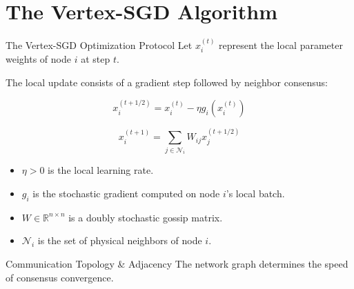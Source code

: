 \section{The Vertex-SGD Algorithm}

\begin{frame}{The Vertex-SGD Optimization Protocol}
    Let $x_i^{(t)}$ represent the local parameter weights of node $i$ at step $t$.
    
    The local update consists of a gradient step followed by neighbor consensus:
    
    \begin{equation}
        x_i^{(t+1/2)} = x_i^{(t)} - \eta g_i\left(x_i^{(t)}\right)
    \end{equation}
    
    \begin{equation}
        x_i^{(t+1)} = \sum_{j \in \mathcal{N}_i} W_{ij} x_j^{(t+1/2)}
    \end{equation}
    
    \vskip 0.5cm
    \begin{itemize}
        \item $\eta > 0$ is the local learning rate.
        \item $g_i$ is the stochastic gradient computed on node $i$'s local batch.
        \item $W \in \mathbb{R}^{n \times n}$ is a doubly stochastic gossip matrix.
        \item $\mathcal{N}_i$ is the set of physical neighbors of node $i$.
    \end{itemize}
\end{frame}

\begin{frame}{Communication Topology \& Adjacency}
    The network graph determines the speed of consensus convergence.
    \vskip 0.5cm
    \begin{center}
    \end{center}
\end{frame}
